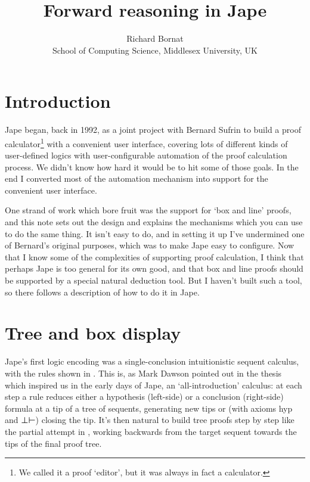\documentclass[11pt]{article}
\title{Forward reasoning in Jape}
\author{Richard Bornat \\ School of Computing Science, Middlesex University, UK
}
\begin{document}
\maketitle

\begin{abstract}
\noindent

\end{abstract}

\section{Introduction}

Jape began, back in 1992, as a joint project with Bernard Sufrin to build a proof calculator\footnote{We called it a proof `editor', but it was always in fact a calculator.} with a convenient user interface, covering lots of different kinds of user-defined logics with user-configurable automation of the proof calculation process. We didn't know how hard it would be to hit some of those goals. In the end I converted most of the automation mechanism into support for the convenient user interface.

One strand of work which bore fruit was the support for `box and line' proofs, and this note sets out the design and explains the mechanisms which you can use to do the same thing. It isn't easy to do, and in setting it up I've undermined one of Bernard's original purposes, which was to make Jape easy to configure. Now that I know some of the complexities of supporting proof calculation, I think that perhaps Jape is too general for its own good, and that box and line proofs should be supported by a special natural deduction tool. But I haven't built such a tool, so there follows a description of how to do it in Jape.

\section{Tree and box display}

Jape's first logic encoding was a single-conclusion intuitionistic sequent calculus, with the rules shown in . This is, as Mark Dawson pointed out in the thesis~\cite{Dawsonthesis1990,DawsonGenericlogicenvironment1992} which inspired us in the early days of Jape, an `all-introduction' calculus: at each step a rule reduces either a hypothesis (left-side) or a conclusion (right-side) formula at a tip of a tree of sequents, generating new tips or (with axioms hyp and ⊥⊢) closing the tip. It's then natural to build tree proofs step by step like the partial attempt in , working backwards from the target sequent towards the tips of the final proof tree.
\end{document}

